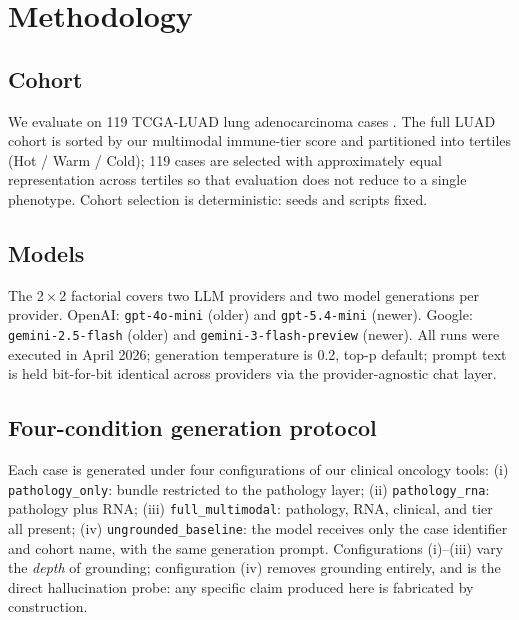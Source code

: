 \documentclass[11pt]{article}
\begin{document}
\section{Methodology}
\label{sec:methods}

\subsection{Cohort}
We evaluate on 119 TCGA-LUAD lung adenocarcinoma cases \citep{collisson2014comprehensive}. The full LUAD cohort is sorted by our multimodal immune-tier score and partitioned into tertiles (Hot / Warm / Cold); 119 cases are selected with approximately equal representation across tertiles so that evaluation does not reduce to a single phenotype. Cohort selection is deterministic: seeds and scripts fixed.

\subsection{Models}
The 2\,$\times$\,2 factorial covers two LLM providers and two model generations per provider. OpenAI: \texttt{gpt-4o-mini} (older) and \texttt{gpt-5.4-mini} (newer). Google: \texttt{gemini-2.5-flash} (older) and \texttt{gemini-3-flash-preview} (newer). All runs were executed in April 2026; generation temperature is 0.2, top-p default; prompt text is held bit-for-bit identical across providers via the provider-agnostic chat layer.

\subsection{Four-condition generation protocol}
Each case is generated under four configurations of our clinical oncology tools: (i) \texttt{pathology\_only}: bundle restricted to the pathology layer; (ii) \texttt{pathology\_rna}: pathology plus RNA; (iii) \texttt{full\_multimodal}: pathology, RNA, clinical, and tier all present; (iv) \texttt{ungrounded\_baseline}: the model receives only the case identifier and cohort name, with the same generation prompt. Configurations (i)--(iii) vary the \emph{depth} of grounding; configuration (iv) removes grounding entirely, and is the direct hallucination probe: any specific claim produced here is fabricated by construction.
\end{document}
